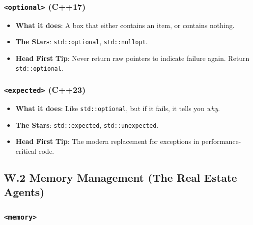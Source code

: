 \hypertarget{optional-c17}{%
\subsubsection{\texorpdfstring{\texttt{\textless{}optional\textgreater{}}
(C++17)}{\textless optional\textgreater{} (C++17)}}\label{optional-c17}}

\begin{itemize}
\tightlist
\item
  \textbf{What it does}: A box that either contains an item, or contains
  nothing.
\item
  \textbf{The Stars}: \passthrough{\lstinline!std::optional!},
  \passthrough{\lstinline!std::nullopt!}.
\item
  \textbf{Head First Tip}: Never return raw pointers to indicate failure
  again. Return \passthrough{\lstinline!std::optional!}.
\end{itemize}

\hypertarget{expected-c23}{%
\subsubsection{\texorpdfstring{\texttt{\textless{}expected\textgreater{}}
(C++23)}{\textless expected\textgreater{} (C++23)}}\label{expected-c23}}

\begin{itemize}
\tightlist
\item
  \textbf{What it does}: Like \passthrough{\lstinline!std::optional!},
  but if it fails, it tells you \emph{why}.
\item
  \textbf{The Stars}: \passthrough{\lstinline!std::expected!},
  \passthrough{\lstinline!std::unexpected!}.
\item
  \textbf{Head First Tip}: The modern replacement for exceptions in
  performance-critical code.
\end{itemize}

\hypertarget{w.2-memory-management-the-real-estate-agents}{%
\subsection{W.2 Memory Management (The Real Estate
Agents)}\label{w.2-memory-management-the-real-estate-agents}}

\hypertarget{memory}{%
\subsubsection{\texorpdfstring{\texttt{\textless{}memory\textgreater{}}}{\textless memory\textgreater{}}}\label{memory}}

